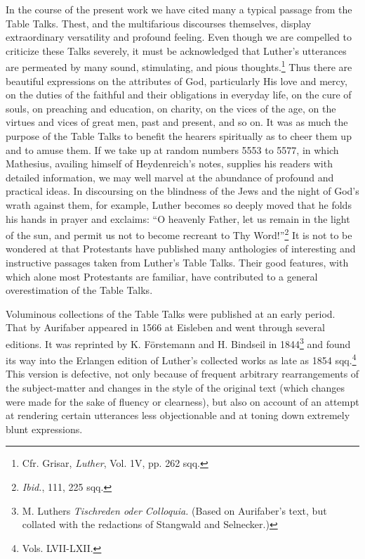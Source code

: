 In the course of the present work we have cited many a typical
passage from the Table Talks. Thest, and the multifarious discourses
themselves, display extraordinary versatility and profound feeling.
Even though we are compelled to criticize these Talks severely, it
must be acknowledged that Luther’s utterances are permeated by
many sound, stimulating, and pious thoughts.\footnote{Cfr. Grisar, \textit{Luther}, Vol. 1V, pp. 262 sqq.}
 Thus there are beautiful
expressions on the attributes of God, particularly His love and
mercy, on the duties of the faithful and their obligations in everyday
life, on the cure of souls, on preaching and education, on charity,
on the vices of the age, on the virtues and vices of great men, past and
present, and so on. It was as much the purpose of the Table Talks
to benefit the hearers spiritually as to cheer them up and to amuse
them. If we take up at random numbers 5553 to 5577, in which
Mathesius, availing himself of Heydenreich’s notes, supplies his readers
with detailed information, we may well marvel at the abundance
of profound and practical ideas. In discoursing on the blindness of
the Jews and the night of God’s wrath against them, for example,
Luther becomes so deeply moved that he folds his hands in prayer
and exclaims: “O heavenly Father, let us remain in the light of the
sun, and permit us not to become recreant to Thy Word!”\footnote{\textit{Ibid.}, 111, 225 sqq.}
 It is not
to be wondered at that Protestants have published many anthologies
of interesting and instructive passages taken from Luther’s Table
Talks. Their good features, with which alone most Protestants are
familiar, have contributed to a general overestimation of the Table
Talks.

Voluminous collections of the Table Talks were published at an
early period. That by Aurifaber appeared in 1566 at Eisleben and
went through several editions. It was reprinted by K. Förstemann and
H. Bindseil in 1844\footnote
{M. Luthers \textit{Tischreden oder Colloquia.} (Based on Aurifaber’s text, but collated with
the redactions of Stangwald and Selnecker.)}
and found its way into the Erlangen edition
of Luther’s collected works as late as 1854 sqq.\footnote{Vols. LVII-LXII.}
 This version is defective,
not only because of frequent arbitrary rearrangements of the
subject-matter and changes in the style of the original text (which
changes were made for the sake of fluency or clearness), but also on
account of an attempt at rendering certain utterances less objectionable
and at toning down extremely blunt expressions.

